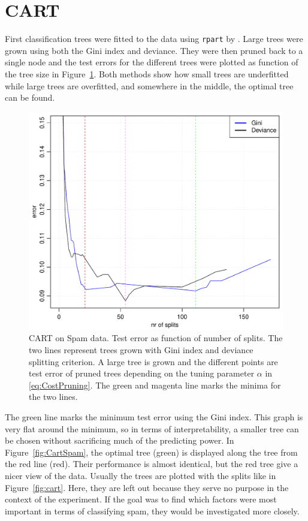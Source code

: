 \section{CART}
\label{sec:CARTsim}
First classification trees were fitted to the data using \verb+rpart+ by \cite{rpart}. Large trees were grown using both the Gini index and deviance. They were then pruned back to a single node and the test errors for the different trees were plotted as function of the tree size in Figure~\ref{fig:cartCPSpam}. 
Both methods show how small trees are underfitted while large trees are overfitted, and somewhere in the middle, the optimal tree can be found. 
%
\begin{figure}[h!tp]
\begin{center}
    \includegraphics[scale=0.5]{./figures/cartCPSpam.pdf}
\end{center}
\caption{CART on Spam data. Test error as function of number of splits. The two lines represent trees grown with Gini index and deviance splitting criterion. A large tree is grown and the different points are test error of pruned trees depending on the tuning parameter $\alpha$ in \eqref{eq:CostPruning}. The green and magenta line marks the minima for the two lines. }
\label{fig:cartCPSpam}
\end{figure}
%

The green line marks the minimum test error using the Gini index. This graph is very flat around the minimum, so in terms of interpretability, a smaller tree can be chosen without sacrificing much of the predicting power. In Figure~\ref{fig:CartSpam}, the optimal tree (green) is displayed along the tree from the red line (red). Their performance is almost identical, but the red tree give a nicer view of the data. Usually the trees are plotted with the splits like in Figure~\ref{fig:cart}. Here, they are left out because they serve no purpose in the context of the experiment. If the goal was to find which factors were most important in terms of classifying spam, they would be investigated more closely.

